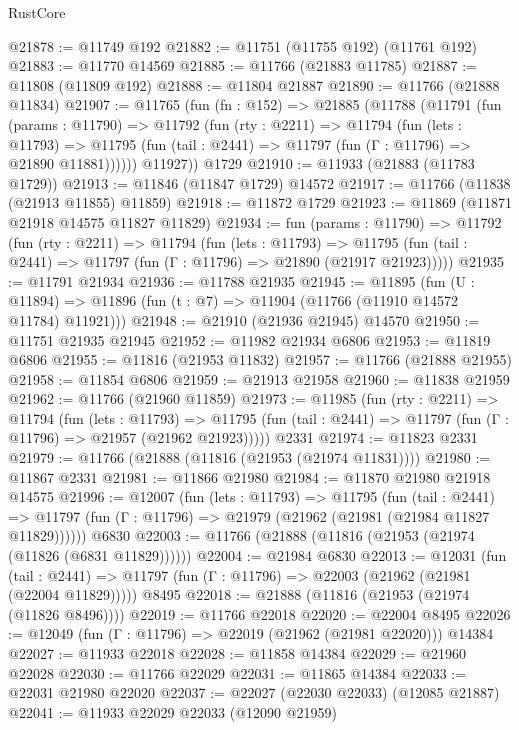 \begin{lexlean}{RustCore}
\begin{coremodule}
@21878 := @11749 @192
@21882 := @11751 (@11755 @192) (@11761 @192)
@21883 := @11770 @14569
@21885 := @11766 (@21883 @11785)
@21887 := @11808 (@11809 @192)
@21888 := @11804 @21887
@21890 := @11766 (@21888 @11834)
@21907 := @11765
    (fun (fn : @152) =>
    @21885
      (@11788
        (@11791
          (fun (params : @11790) =>
          @11792
            (fun (rty : @2211) =>
            @11794
              (fun (lets : @11793) =>
              @11795 (fun (tail : @2441) => @11797 (fun (Γ : @11796) => @21890 @11881))))))
        @11927))
    @1729
@21910 := @11933 (@21883 (@11783 @1729))
@21913 := @11846 (@11847 @1729) @14572
@21917 := @11766 (@11838 (@21913 @11855) @11859)
@21918 := @11872 @1729
@21923 := @11869 (@11871 @21918 @14575 @11827 @11829)
@21934 := fun (params : @11790) =>
  @11792
    (fun (rty : @2211) =>
    @11794
      (fun (lets : @11793) =>
      @11795 (fun (tail : @2441) => @11797 (fun (Γ : @11796) => @21890 (@21917 @21923)))))
@21935 := @11791 @21934
@21936 := @11788 @21935
@21945 := @11895
    (fun (U : @11894) => @11896 (fun (t : @7) => @11904 (@11766 (@11910 @14572 @11784) @11921)))
@21948 := @21910 (@21936 @21945) @14570
@21950 := @11751 @21935 @21945
@21952 := @11982 @21934 @6806
@21953 := @11819 @6806
@21955 := @11816 (@21953 @11832)
@21957 := @11766 (@21888 @21955)
@21958 := @11854 @6806
@21959 := @21913 @21958
@21960 := @11838 @21959
@21962 := @11766 (@21960 @11859)
@21973 := @11985
    (fun (rty : @2211) =>
    @11794
      (fun (lets : @11793) =>
      @11795 (fun (tail : @2441) => @11797 (fun (Γ : @11796) => @21957 (@21962 @21923)))))
    @2331
@21974 := @11823 @2331
@21979 := @11766 (@21888 (@11816 (@21953 (@21974 @11831))))
@21980 := @11867 @2331
@21981 := @11866 @21980
@21984 := @11870 @21980 @21918 @14575
@21996 := @12007
    (fun (lets : @11793) =>
    @11795
      (fun (tail : @2441) =>
      @11797 (fun (Γ : @11796) => @21979 (@21962 (@21981 (@21984 @11827 @11829))))))
    @6830
@22003 := @11766 (@21888 (@11816 (@21953 (@21974 (@11826 (@6831 @11829))))))
@22004 := @21984 @6830
@22013 := @12031
    (fun (tail : @2441) => @11797 (fun (Γ : @11796) => @22003 (@21962 (@21981 (@22004 @11829)))))
    @8495
@22018 := @21888 (@11816 (@21953 (@21974 (@11826 @8496))))
@22019 := @11766 @22018
@22020 := @22004 @8495
@22026 := @12049 (fun (Γ : @11796) => @22019 (@21962 (@21981 @22020))) @14384
@22027 := @11933 @22018
@22028 := @11858 @14384
@22029 := @21960 @22028
@22030 := @11766 @22029
@22031 := @11865 @14384
@22033 := @22031 @21980 @22020
@22037 := @22027 (@22030 @22033) (@12085 @21887)
@22041 := @11933 @22029 @22033 (@12090 @21959)

\end{coremodule}
\end{lexlean}
